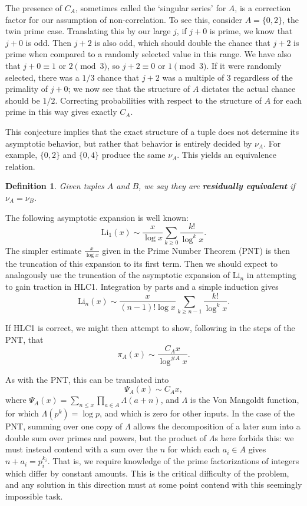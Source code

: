 \documentclass[11pt, leqno]{article}
\newtheorem{definition}[theorem]{Definition}
\newcommand{\Li}{\mathrm{Li}}
\begin{document}
The presence of $C_A$, sometimes called the `singular series' for $A$,
is a correction factor for our assumption of non-correlation.
To see this, consider $A=\{0,2\}$, the twin prime case.
Translating this by our large $j$, if $j+0$ is prime,
we know that $j+0$ is odd. 
Then $j+2$ is also odd, which should double the chance that $j+2$ is prime when
compared to a randomly selected value in this range.
We have also that $j+0\equiv 1$ or $2 \pmod 3$, so $j+2\equiv 0$ or $1 \pmod 3$.
If it were randomly selected, there was a $1/3$ chance that $j+2$ was a multiple of 3 
regardless of the primality of $j+0$; we now see that the structure of $A$
dictates the actual chance should be $1/2$.
Correcting probabilities with respect to the structure of $A$ for each 
prime in this way gives exactly $C_A$.

This conjecture implies that the exact structure of a tuple
does not determine its asymptotic behavior, but
rather that behavior is entirely decided by $\nu_A$.
For example, $\{0,2\}$ and $\{0,4\}$ produce the same $\nu_A$.
This yields an equivalence relation.

\begin{definition}
    Given tuples $A$ and $B$, we say they are \textbf{residually equivalent} if
    $\nu_A=\nu_B$.
\end{definition}

The following asymptotic expansion is well known:
\begin{equation}\label{Li1 asymp}
\Li_1(x) \sim \frac{x}{\log{x}}\sum_{k\ge 0} \frac{k!}{\log^{k}{x}}.
\end{equation}
The simpler estimate $\frac{x}{\log{x}}$ given in the Prime Number Theorem (PNT) is then
the truncation of this expansion to its first term.
Then we should expect to analagously use the truncation of 
the asymptotic expansion of $\Li_n$ in attempting to gain traction in HLC1.
Integration by parts and a simple induction gives
$$\Li_n(x) \sim \frac{x}{(n-1)!\log{x}}\sum_{k\ge n-1}\frac{k!}{\log^k{x}}.$$

If HLC1 is correct,
we might then attempt to show, following in the steps of the PNT,
that 
$$\pi_A(x) \sim \frac{C_Ax}{\log^{\#A}{x}}.$$

As with the PNT, this can be translated into
$$\Psi_A(x)\sim C_Ax,$$
where $\Psi_A(x)=\sum_{n\le x}\prod_{a\in A}\Lambda(a+n)$,
and $\Lambda$ is the Von Mangoldt function, for which $\Lambda(p^k)=\log{p}$,
and which is zero for other inputs.
In the case of the PNT, summing over one copy of $\Lambda$ allows
the decomposition of a later sum into a double sum over primes and powers,
but the product of $\Lambda$s here forbids this: we must instead contend
with a sum over the $n$ for which each $a_i\in A$ gives $n+a_i=p_i^{k_i}$.
That is, we require knowledge of the prime factorizations of integers
which differ by constant amounts. 
This is the critical difficulty of the problem, and any solution in this
direction must at some point contend with this seemingly impossible task.
\end{document}
